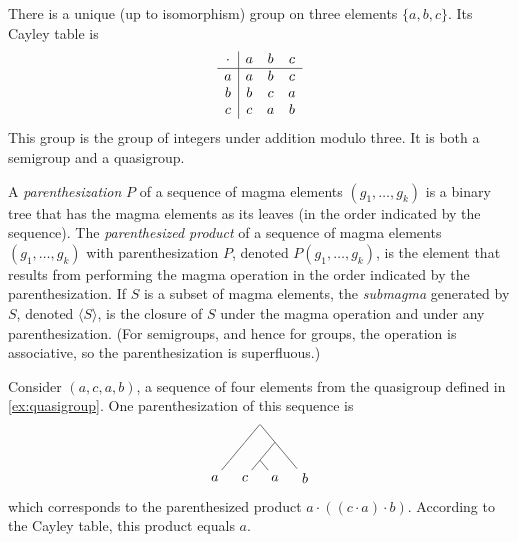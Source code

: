\documentclass{article}
\newcommand{\gen}[1]{\langle #1 \rangle}
\begin{document}
\begin{example}
  There is a unique (up to isomorphism) group on three elements $\{a, b, c\}$.
  Its Cayley table is
  \begin{equation*}
    \begin{array}{c | c c c}
      \cdot & a & b & c \\
      \hline
      a & a & b & c \\
      b & b & c & a \\
      c & c & a & b \\
    \end{array}
  \end{equation*}
  This group is the group of integers under addition modulo three.
  It is both a semigroup and a quasigroup.
\end{example}

A \emph{parenthesization} $P$ of a sequence of magma elements $(g_1, \dotsc, g_k)$ is a binary tree that has the magma elements as its leaves (in the order indicated by the sequence).
The \emph{parenthesized product} of a sequence of magma elements $(g_1, \dotsc, g_k)$ with parenthesization $P$, denoted $P(g_1, \dotsc, g_k)$, is the element that results from performing the magma operation in the order indicated by the parenthesization.
If $S$ is a subset of magma elements, the \emph{submagma} generated by $S$, denoted $\gen{S}$, is the closure of $S$ under the magma operation and under any parenthesization.
(For semigroups, and hence for groups, the operation is associative, so the parenthesization is superfluous.)

\begin{example}
  Consider $(a, c, a, b)$, a sequence of four elements from the quasigroup defined in \autoref{ex:quasigroup}.
  One parenthesization of this sequence is
  \begin{equation*}
    \begin{tikzpicture}[xscale=0.5, yscale=0.3]
      \node[minimum size=0pt, inner sep=0pt] {}
      child {
        child {
          child {node {$a$}}
          child[color=white] {}
        }
        child[color=white] {}
      }
      child {
        child {
          child {node {$c$}}
          child {node {$a$}}
        }
        child {
          child[color=white] {}
          child {node {$b$}}
        }
      };
    \end{tikzpicture}
  \end{equation*}
  which corresponds to the parenthesized product $a \cdot ((c \cdot a) \cdot b)$.
  According to the Cayley table, this product equals $a$.
\end{example}
\end{document}
